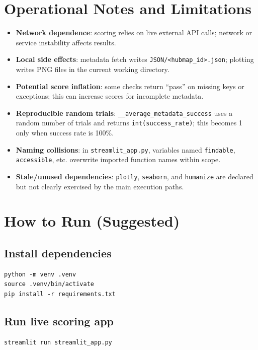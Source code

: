 \documentclass[11pt]{article}
\begin{document}
\section{Operational Notes and Limitations}
\begin{itemize}[leftmargin=2em]
  \item \textbf{Network dependence}: scoring relies on live external API calls; network or service instability affects results.
  \item \textbf{Local side effects}: metadata fetch writes \texttt{JSON/<hubmap\_id>.json}; plotting writes PNG files in the current working directory.
  \item \textbf{Potential score inflation}: some checks return ``pass'' on missing keys or exceptions; this can increase scores for incomplete metadata.
  \item \textbf{Reproducible random trials}: \texttt{\_\_average\_metadata\_success} uses a random number of trials and returns \texttt{int(success\_rate)}; this becomes 1 only when success rate is 100\%.
  \item \textbf{Naming collisions}: in \texttt{streamlit\_app.py}, variables named \texttt{findable}, \texttt{accessible}, etc. overwrite imported function names within scope.
  \item \textbf{Stale/unused dependencies}: \texttt{plotly}, \texttt{seaborn}, and \texttt{humanize} are declared but not clearly exercised by the main execution paths.
\end{itemize}

\section{How to Run (Suggested)}
\subsection{Install dependencies}
\begin{lstlisting}[style=base,caption={Install dependencies.}]
python -m venv .venv
source .venv/bin/activate
pip install -r requirements.txt
\end{lstlisting}

\subsection{Run live scoring app}
\begin{lstlisting}[style=base,caption={Run live scoring Streamlit app.}]
streamlit run streamlit_app.py
\end{lstlisting}
\end{document}
